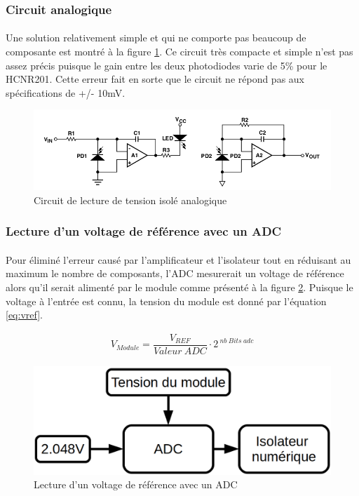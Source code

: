 	\subsubsection*{Circuit analogique}
	\paragraph*{}
	Une solution relativement simple et qui ne comporte pas beaucoup de composante est montré à la figure \ref{fig:HCNR201}. Ce circuit très compacte et simple n'est pas assez précis puisque le gain entre les deux photodiodes varie de 5\% pour le HCNR201. Cette erreur fait en sorte que le circuit ne répond pas aux spécifications de +/- 10mV.  
	
	\begin{figure}[H]
		\centering
		\includegraphics[scale = 0.5]{Images/Analogique.png}
		\caption{Circuit de lecture de tension isolé analogique \cite{HCNR201}}
		\label{fig:HCNR201}
	\end{figure}


	\newpage
	\subsubsection*{Lecture d'un voltage de référence avec un ADC}
	\paragraph*{}	
	Pour éliminé l'erreur causé par l'amplificateur et l'isolateur tout en réduisant au maximum le nombre de composants, l'ADC mesurerait un voltage de référence alors qu'il serait alimenté par le module comme présenté à la figure \ref{fig:adc_vref}. Puisque le voltage à l'entrée est connu, la tension du module est donné par l'équation \ref{eq:vref}.
	
	\begin{align}
		V_{Module} = \dfrac{V_{REF}}{Valeur~ADC} \cdot 2^{~nb~Bits~adc}
		\label{eq:vref}
	\end{align}
	
	\begin{figure}[H]
		\centering
		\includegraphics[scale=0.3]{Images/Voltage_reference.png}
		\caption{Lecture d'un voltage de référence avec un ADC}
		\label{fig:adc_vref}
	\end{figure}
	
